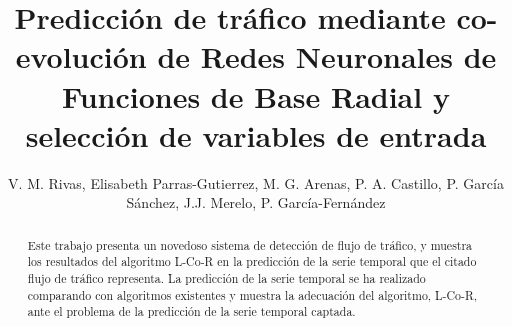 \documentclass[runningheads]{llncs}
\begin{document}
\mainmatter  %



\title{Predicción de tr\'afico mediante co-evolución de Redes Neuronales de Funciones de Base Radial y selección de variables de
entrada }

\author{V. M. Rivas, Elisabeth Parras-Gutierrez, M. G. Arenas, P. A. Castillo, P. García
Sánchez, J.J. Merelo, P. García-Fernández}

%







\maketitle
\thispagestyle{empty}
\pagestyle{empty}
\begin{abstract}
Este trabajo presenta un novedoso sistema de detección de flujo de tráfico, y muestra los resultados del algoritmo L-Co-R en la
predicción de la serie temporal que el citado flujo de tráfico representa. La predicción de la serie temporal se ha realizado
comparando con algoritmos existentes y muestra la adecuación del algoritmo, L-Co-R, ante el
problema de la predicción de la serie temporal captada.
\end{abstract}
\end{document}
